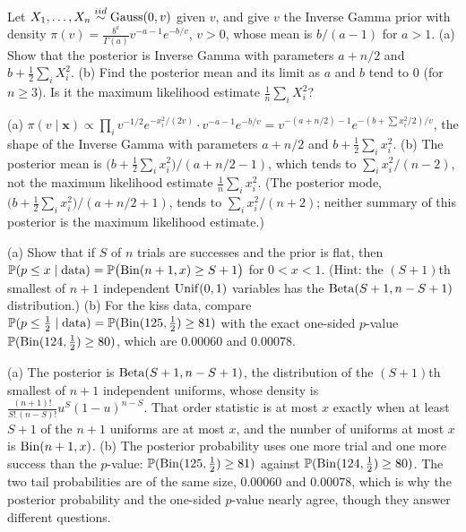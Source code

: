 \begin{exercise}
\label{ex:bayes-invgamma}
Let $X_1, \ldots, X_n \stackrel{iid}{\sim} \text{Gauss}(0, v)$ given $v$, and give $v$ the Inverse Gamma prior with density $\pi(v) = \frac{b^a}{\Gamma(a)}v^{-a-1}e^{-b/v}$, $v > 0$, whose mean is $b/(a - 1)$ for $a > 1$. (a) Show that the posterior is Inverse Gamma with parameters $a + n/2$ and $b + \frac12\sum_i X_i^2$. (b) Find the posterior mean and its limit as $a$ and $b$ tend to $0$ (for $n \geq 3$). Is it the maximum likelihood estimate $\frac1n\sum_i X_i^2$?
\end{exercise}
\begin{solution}
(a) $\pi(v \mid \mathbf{x}) \propto \prod_i v^{-1/2}e^{-x_i^2/(2v)} \cdot v^{-a-1}e^{-b/v} = v^{-(a + n/2) - 1}e^{-(b + \sum x_i^2/2)/v}$, the shape of the Inverse Gamma with parameters $a + n/2$ and $b + \frac12\sum_i x_i^2$. (b) The posterior mean is $\big(b + \frac12\sum_i x_i^2\big)/(a + n/2 - 1)$, which tends to $\sum_i x_i^2/(n - 2)$, not the maximum likelihood estimate $\frac1n\sum_i x_i^2$. (The posterior mode, $\big(b + \frac12\sum_i x_i^2\big)/(a + n/2 + 1)$, tends to $\sum_i x_i^2/(n + 2)$; neither summary of this posterior is the maximum likelihood estimate.)
\end{solution}

\begin{exercise}
\label{ex:bayes-tail}
(a) Show that if $S$ of $n$ trials are successes and the prior is flat, then $\mathbb{P}(p \leq x \mid \text{data}) = \mathbb{P}\big(\mathrm{Bin}(n + 1, x) \geq S + 1\big)$ for $0 < x < 1$. (Hint: the $(S + 1)$th smallest of $n + 1$ independent $\mathrm{Unif}(0, 1)$ variables has the $\mathrm{Beta}(S + 1, n - S + 1)$ distribution.) (b) For the kiss data, compare $\mathbb{P}(p \leq \frac12 \mid \text{data}) = \mathbb{P}(\mathrm{Bin}(125, \frac12) \geq 81)$ with the exact one-sided $p$-value $\mathbb{P}(\mathrm{Bin}(124, \frac12) \geq 80)$, which are $0.00060$ and $0.00078$.
\end{exercise}
\begin{solution}
(a) The posterior is $\mathrm{Beta}(S + 1, n - S + 1)$, the distribution of the $(S + 1)$th smallest of $n + 1$ independent uniforms, whose density is $\frac{(n + 1)!}{S!\,(n - S)!}u^S(1 - u)^{n - S}$. That order statistic is at most $x$ exactly when at least $S + 1$ of the $n + 1$ uniforms are at most $x$, and the number of uniforms at most $x$ is $\mathrm{Bin}(n + 1, x)$. (b) The posterior probability uses one more trial and one more success than the $p$-value: $\mathbb{P}(\mathrm{Bin}(125, \frac12) \geq 81)$ against $\mathbb{P}(\mathrm{Bin}(124, \frac12) \geq 80)$. The two tail probabilities are of the same size, $0.00060$ and $0.00078$, which is why the posterior probability and the one-sided $p$-value nearly agree, though they answer different questions.
\end{solution}

